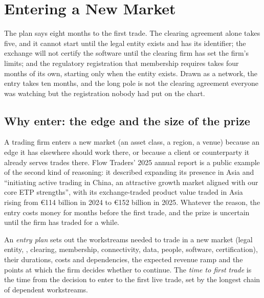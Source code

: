 \chapter{Entering a New Market}\label{ch:fm:entering-a-new-market}

The plan says eight months to the first trade. The clearing agreement alone takes five, and it cannot start until the legal entity exists and
has its identifier; the exchange will not certify the software until the clearing firm has set the firm's limits; and the regulatory registration
that membership requires takes four months of its own, starting only when the entity exists. Drawn as a network, the entry takes ten months, and the
long pole is not the clearing agreement everyone was watching but the registration nobody had put on the chart.

\section{Why enter: the edge and the size of the prize}

A trading firm enters a new market (an asset class, a region, a venue) because an edge it has elsewhere should work there, or because a client or
counterparty it already serves trades there. Flow Traders' 2025 annual report is a public example of the second kind of reasoning: it described
expanding its presence in Asia and ``initiating active trading in China, an attractive growth market aligned with our core ETP strengths'', with its
exchange-traded product value traded in Asia rising from \euro114 billion in 2024 to \euro152 billion in 2025. Whatever the reason, the entry costs
money for months before the first trade, and the prize is uncertain until the firm has traded for a while.

\begin{definition}\label{def:fm:entering-a-new-market:plan}
An \emph{entry plan} sets out the workstreams needed to trade in a new market (legal entity, , clearing,
membership, connectivity, data, people, software, certification), their durations, costs and dependencies, the expected revenue ramp and the
points at which the firm decides whether to continue. The \emph{time to first trade} is the time from the decision to
enter to the first live trade, set by the longest chain of dependent workstreams.
\end{definition}

